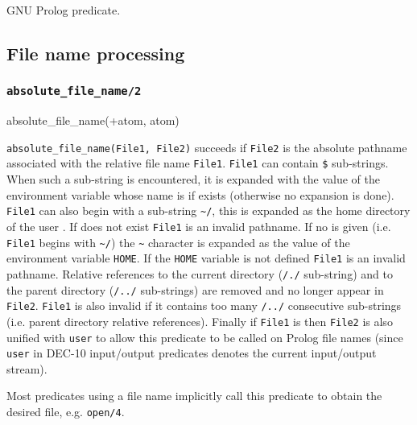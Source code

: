 \Portability

GNU Prolog predicate.

\subsection{File name processing}

\subsubsection{\texttt{absolute\_file\_name/2}}
\label{absolute-file-name/2}

\begin{TemplatesOneCol}
absolute\_file\_name(+atom, atom)

\end{TemplatesOneCol}

\Description

\texttt{absolute\_file\_name(File1, File2)} succeeds if \texttt{File2} is
the absolute pathname associated with the relative file name \texttt{File1}.
\texttt{File1} can contain \texttt{\$} sub-strings. When
such a sub-string is encountered, it is expanded with the value of the
environment variable whose name is  if exists
(otherwise no expansion is done). \texttt{File1} can also begin with a
sub-string \texttt{\~{}/}, this is expanded as the home
directory of the user . If
 does not exist \texttt{File1} is an invalid
pathname. If no  is given (i.e. \texttt{File1}
begins with \texttt{\~{}/}) the \texttt{\~{}} character is expanded as the
value of the environment variable \texttt{HOME}. If the \texttt{HOME}
variable is not defined \texttt{File1} is an invalid pathname. Relative
references to the current directory (\texttt{/./} sub-string) and to the
parent directory (\texttt{/../} sub-strings) are removed and no longer
appear in \texttt{File2}. \texttt{File1} is also invalid if it contains too
many \texttt{/../} consecutive sub-strings (i.e. parent directory relative
references). Finally if \texttt{File1} is  then \texttt{File2}
is also unified with \texttt{user} to allow this predicate to be called on
Prolog file names (since \texttt{user} in DEC-10 input/output predicates
denotes the current input/output stream). 

Most predicates using a file name implicitly call this predicate to obtain
the desired file, e.g. \texttt{open/4}. 

